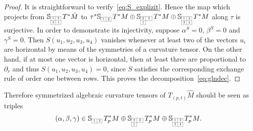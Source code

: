 \documentclass[11pt,a4paper]{article}
\theoremstyle{plain}
\theoremstyle{remark}
\newcommand{\bbS}{\mathbb{S}}
\begin{document}
\begin{proof}
It is straightforward to verify~\eqref{eq:S_explizit}. Hence the map which projects from $\bbS_{\scaleto{\begin{array}{|c|c|}
\cline{1-2}
1 & 2 \\
\cline{1-2}
3 & 4 \\
\cline{1-2}
\end{array}}{12pt}}\, T^*\hat M $ to $\tau^*\bbS_{\scaleto{\begin{array}{|c|c|}
\cline{1-2}
1 & 2 \\
\cline{1-2}
\end{array}}{6pt}}\,T^*M \oplus\bbS_{\scaleto{\begin{array}{|c|c|}
\cline{1-2}
2 & 3 \\
\cline{1-2}
1 & \multicolumn{1}{c}{\;\;\;} \\
\cline{1-1}
\end{array}}{12pt}}\,T^*M \oplus \bbS_{\scaleto{\begin{array}{|c|c|}
\cline{1-2}
1 & 2 \\
\cline{1-2}
3 & 4 \\
\cline{1-2}
\end{array}}{12pt}}\,T^ *M $ along $\tau$ is surjective. In order to demonstrate its injectivity, suppose $\alpha^S = 0$, $\beta^S = 0$ and $\gamma^S = 0$. 
Then $S(u_1,u_2,u_3,u_4)$ vanishes whenever at least two of the vectors $u_i$ are horizontal by means of the symmetries of a curvature tensor.
On the other hand, if at most one vector is horizontal, then at least three
are proportional to $\partial_r$ and thus $S(u_1,u_2,u_3,u_4) = 0$, since $S$
satisfies the corresponding exchange rule of order one between rows. This proves the  decomposition~\eqref{eq:glndec}.
\end{proof} 



Therefore symmetrized algebraic curvature tensors of $T_{(p,t)}\hat M$ should be seen as triples 
\[
(\alpha,\beta,\gamma) \in \bbS_{\scaleto{\begin{array}{|c|c|}
\cline{1-2}
1 & 2 \\
\cline{1-2}
\end{array}}{6pt}}\,T_p^*M  \oplus \bbS_{\scaleto{\begin{array}{|c|c|}
\cline{1-2}
2 & 3 \\
\cline{1-2}
1 & \multicolumn{1}{c}{\;\;\;} \\
\cline{1-1}
\end{array}}{12pt}}\, T_p^*M \oplus  \bbS_{\scaleto{\begin{array}{|c|c|}
\cline{1-2}
1 & 2 \\
\cline{1-2}
3 & 4 \\
\cline{1-2}
\end{array}}{12pt}}\, T_p^*M.
\]  
\end{document}
